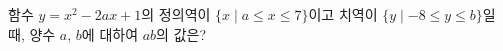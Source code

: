 함수 $y=x^2-2ax+1$의 정의역이 $\{x \mid a\le x\le 7\}$이고 치역이 $\{y \mid -8\le y\le b\}$일 때, 양수 $a$, $b$에 대하여 $ab$의 값은?
